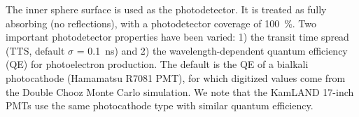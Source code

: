 \documentclass[aps,prc,twocolumn,groupedaddress,showpacs,amsmath,amssymb,floatfix,superscriptaddress]{revtex4}
\begin{document}
The inner sphere surface is used as the photodetector. It is treated
as fully absorbing (no reflections), with a photodetector coverage of
100~\%. Two important photodetector properties have been varied: 1)
the transit time spread (TTS, default $\sigma$ = 0.1~ns) and 2) the
wavelength-dependent quantum efficiency (QE) for photoelectron
production. The default is the QE of a bialkali photocathode (Hamamatsu
R7081 PMT), for which digitized values come from the Double Chooz \cite{dctwo}
Monte Carlo simulation. We note that the KamLAND 17-inch PMTs use the
same photocathode type with similar quantum efficiency.

\begin{figure}[tbh]
\begin{center}

\end{center}
\end{figure}
\end{document}
